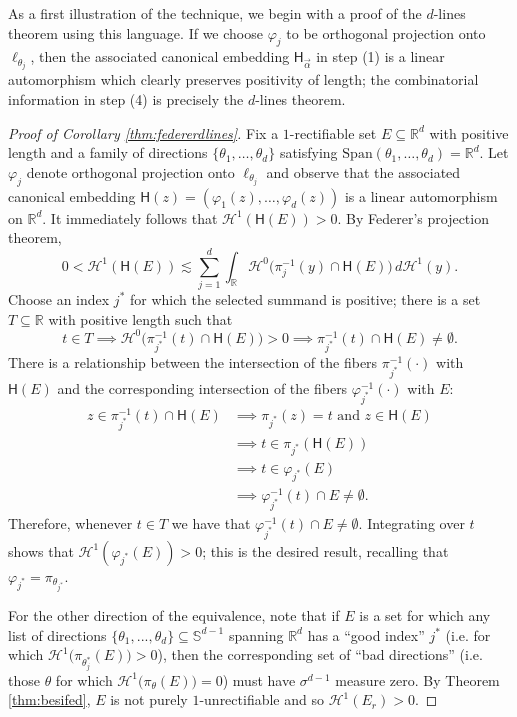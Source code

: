 \documentclass[12pt]{amsart}
\theoremstyle{definition}
\numberwithin{equation}{section}
\newcommand{\R}{\mathbb{R}}
\begin{document}
As a first illustration of the technique, we begin with a proof of the $d$-lines theorem using this language. If we choose $\varphi_{j}$ to be orthogonal projection onto $\ell_{\theta_j}$, then the associated canonical embedding $\mathsf{H}_{\vec \alpha}$ in step (1) is a linear automorphism which clearly preserves positivity of length; the combinatorial information in step (4) is precisely the $d$-lines theorem. 

\begin{proof}[Proof of Corollary \ref{thm:federerdlines}] 
Fix a $1$-rectifiable set $E \subseteq \mathbb{R}^d$ with positive length and a family of directions $\{\theta_1, \dots, \theta_d\}$ satisfying $\mathrm{Span}(\theta_1, \dots, \theta_d) = \R^d$. Let $\varphi_j$ denote orthogonal projection onto $\ell_{\theta_j}$ and observe that the associated canonical embedding $\mathsf{H}(z) = (\varphi_1(z), \dots, \varphi_d(z))$ is a linear automorphism on $\mathbb{R}^d$. It immediately follows that $\mathcal{H}^1(\mathsf{H}(E)) > 0$. By Federer's projection theorem,
$$0 < \mathcal{H}^1(\mathsf{H}(E)) \lesssim \sum_{j = 1}^d \int_{\mathbb{R}} \mathcal{H}^0\big(\pi_j^{-1}(y) \cap \mathsf{H}(E)\big) \, d\mathcal{H}^1(y).$$
Choose an index $j^{\ast}$ for which the selected summand is positive; there is a set $T \subseteq \mathbb{R}$ with positive length such that
$$t \in T \implies \mathcal{H}^0\big(\pi_{j^{\ast}}^{-1}(t) \cap \mathsf{H}(E)\big) > 0 \implies \pi_{j^{\ast}}^{-1}(t) \cap \mathsf{H}(E) \ne \emptyset.$$
There is a relationship between the intersection of the fibers $\pi_{j^{\ast}}^{-1}(\cdot)$ with $\mathsf{H}(E)$ and the corresponding intersection of the fibers $\varphi_{j^{\ast}}^{-1}(\cdot)$ with $E$:
\begin{align*}
    z \in \pi_{j^{\ast}}^{-1}(t) \cap \mathsf{H}(E) &\implies \pi_{j^{\ast}}(z) = t \text{ and } z \in \mathsf{H}(E) \\
    &\implies t \in \pi_{j^{\ast}}(\mathsf{H}(E)) \\
    &\implies t \in \varphi_{j^{\ast}}(E) \\
    &\implies \varphi_{j^{\ast}}^{-1}(t) \cap E \ne \emptyset.
\end{align*}
Therefore, whenever $t \in T$ we have that $\varphi_{j^{\ast}}^{-1}(t) \cap E \ne \emptyset.$ Integrating over $t$ shows that $\mathcal{H}^1(\varphi_{j^{\ast}}(E)) > 0$; this is the desired result, recalling that $\varphi_{j^{\ast}} = \pi_{\theta_{j^{\ast}}}.$

For the other direction of the equivalence, note that if $E$ is a set for which any list of directions $\{\theta_1, ..., \theta_d\} \subseteq \mathbb{S}^{d - 1}$ spanning $\mathbb{R}^d$ has a ``good index'' $j^{\ast}$ (i.e. for which $\mathcal{H}^1\big(\pi_{\theta_j^*}(E)\big) > 0$), then the corresponding set of ``bad directions'' (i.e. those $\theta$ for which $\mathcal{H}^1\big(\pi_{\theta}(E)\big) = 0$) must have $\sigma^{d - 1}$ measure zero. By Theorem \ref{thm:besifed}, $E$ is not purely $1$-unrectifiable and so $\mathcal{H}^1(E_r) > 0$. 
\end{proof}
\end{document}
